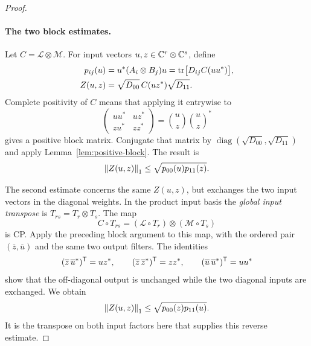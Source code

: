 \begin{proof}
\paragraph{The two block estimates.}
Let $C=\mathcal L\otimes\mathcal M$.  For input vectors
$u,z\in\mathbb C^r\otimes\mathbb C^s$, define
\[
 \begin{split}
 p_{ij}(u)&=u^*(A_i\otimes B_j)u
       =\operatorname{tr}\bigl[D_{ij}C(uu^*)\bigr],\\
 Z(u,z)&=\sqrt{D_{00}}\,C(uz^*)\sqrt{D_{11}}.
 \end{split}
\]
Complete positivity of $C$ means that applying it entrywise to
\[
 \begin{pmatrix}uu^*&uz^*\\ zu^*&zz^*\end{pmatrix}
 =\binom{u}{z}\binom{u}{z}^*
\]
gives a positive block matrix.  Conjugate that matrix by
$\operatorname{diag}(\sqrt{D_{00}},\sqrt{D_{11}})$ and apply
Lemma~\ref{lem:positive-block}.  The result is
\begin{equation}\label{eq:direct-block-bound}
 \left\lVert Z(u,z)\right\rVert_1\le\sqrt{p_{00}(u)p_{11}(z)}.
\end{equation}

The second estimate concerns the same $Z(u,z)$, but exchanges the two
input vectors in the diagonal weights.  In the product input basis the
\emph{global input transpose} is $T_{rs}=T_r\otimes T_s$.  The map
\[
 C\circ T_{rs}=(\mathcal L\circ T_r)\otimes
                (\mathcal M\circ T_s)
\]
is CP.  Apply the preceding block argument to this map, with the
ordered pair $(\overline z,\overline u)$ and the same two output filters.
The identities
\[
 (\overline z\,\overline u^*)^\mathsf T=uz^*,\qquad
 (\overline z\,\overline z^*)^\mathsf T=zz^*,\qquad
 (\overline u\,\overline u^*)^\mathsf T=uu^*
\]
show that the off-diagonal output is unchanged while the two diagonal
inputs are exchanged.  We obtain
\begin{equation}\label{eq:reversed-block-bound}
 \left\lVert Z(u,z)\right\rVert_1\le\sqrt{p_{00}(z)p_{11}(u)}.
\end{equation}
It is the transpose on both input factors here that supplies this
reverse estimate.


\end{proof}
